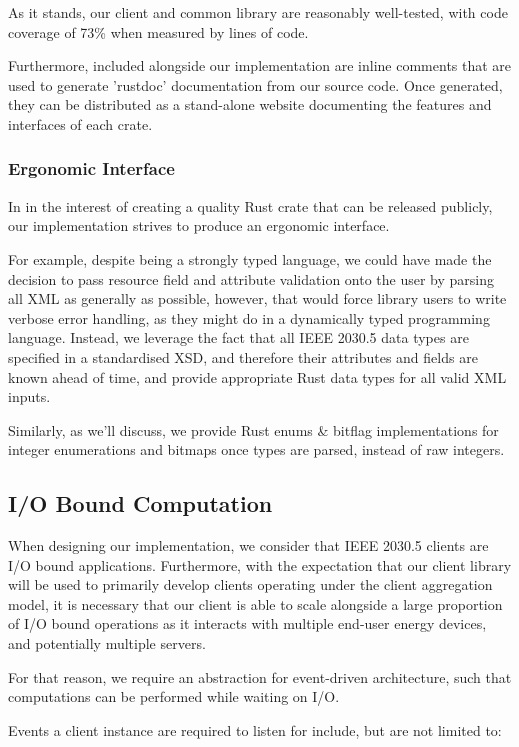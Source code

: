 As it stands, our client and common library are reasonably well-tested, with code coverage of 73\% when measured by lines of code.

Furthermore, included alongside our implementation are inline comments that are used to generate 'rustdoc' documentation from our source code. Once generated, they can be distributed as a stand-alone website documenting the features and interfaces of each crate.

\subsubsection{Ergonomic Interface}

In in the interest of creating a quality Rust crate that can be released publicly, our implementation strives to produce an ergonomic interface. 

For example, despite being a strongly typed language, we could have made the decision to pass resource field and attribute validation onto the user by parsing all XML as generally as possible, however, that would force library users to write verbose error handling, as they might do in a dynamically typed programming language. Instead, we leverage the fact that all IEEE 2030.5 data types are specified in a standardised XSD, and therefore their attributes and fields are known ahead of time, and provide appropriate Rust data types for all valid XML inputs.

Similarly, as we'll discuss, we provide Rust enums \& bitflag implementations for integer enumerations and bitmaps once types are parsed, instead of raw integers.

\subsection{I/O Bound Computation}
When designing our implementation, we consider that IEEE 2030.5 clients are I/O bound applications. Furthermore, with the expectation that our client library will be used to primarily develop clients operating under the client aggregation model, it is necessary that our client is able to scale alongside a large proportion of I/O bound operations as it interacts with multiple end-user energy devices, and potentially multiple servers.

For that reason, we require an abstraction for event-driven architecture, such that computations can be performed while waiting on I/O.

Events a client instance are required to listen for include, but are not limited to:

